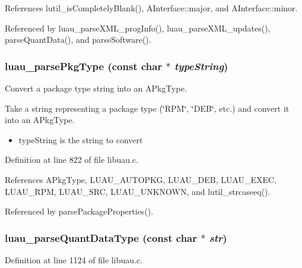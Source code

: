 References lutil\_\-is\-Completely\-Blank(), AInterface::major, and AInterface::minor.

Referenced by luau\_\-parse\-XML\_\-prog\-Info(), luau\_\-parse\-XML\_\-updates(), parse\-Quant\-Data(), and parse\-Software().
\subsubsection{ luau\_\-parse\-Pkg\-Type (const char $\ast$ {\em type\-String})}\label{libuau_8h_a70}


Convert a package type string into an APkg\-Type. 

Take a string representing a package type (\char`\"{}RPM\char`\"{}, \char`\"{}DEB\char`\"{}, etc.) and convert it into an APkg\-Type.

\begin{itemize}
\item type\-String is the string to convert 
\end{itemize}


Definition at line 822 of file libuau.c.

References APkg\-Type, LUAU\_\-AUTOPKG, LUAU\_\-DEB, LUAU\_\-EXEC, LUAU\_\-RPM, LUAU\_\-SRC, LUAU\_\-UNKNOWN, and lutil\_\-strcaseeq().

Referenced by parse\-Package\-Properties().
\subsubsection{ luau\_\-parse\-Quant\-Data\-Type (const char $\ast$ {\em str})}\label{libuau_8h_a87}




Definition at line 1124 of file libuau.c.

